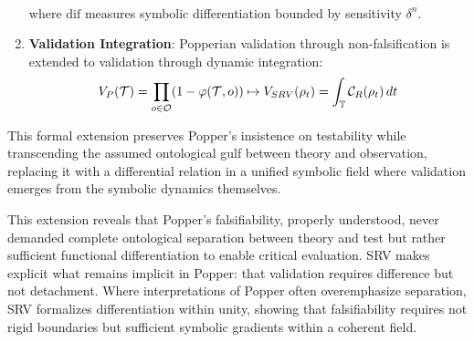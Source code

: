 \begin{scholium}
\begin{enumerate}[label=(\roman*)]
\begin{align}
\end{align}
where $\text{dif}$ measures symbolic differentiation bounded by sensitivity $\delta^n$.
\item \textbf{Validation Integration}: Popperian validation through non-falsification is extended to validation through dynamic integration:
\begin{align}
V_P(\mathcal{T}) = \prod_{o \in \mathcal{O}} (1 - \varphi(\mathcal{T}, o)) \mapsto V_{SRV}(\rho_t) = \int_{\mathbb{T}} \mathcal{C}_{R}(\rho_t) \, dt
\end{align}
\end{enumerate}
This formal extension preserves Popper's insistence on testability while transcending the assumed ontological gulf between theory and observation, replacing it with a differential relation in a unified symbolic field where validation emerges from the symbolic dynamics themselves.
\end{scholium}
\begin{remark}
\label{remark:bk7_unnamed_remark_05}
This extension reveals that Popper's falsifiability, properly understood, never demanded complete ontological separation between theory and test but rather sufficient functional differentiation to enable critical evaluation. SRV makes explicit what remains implicit in Popper: that validation requires difference but not detachment. Where interpretations of Popper often overemphasize separation, SRV formalizes differentiation within unity, showing that falsifiability requires not rigid boundaries but sufficient symbolic gradients within a coherent field.
\end{remark}
